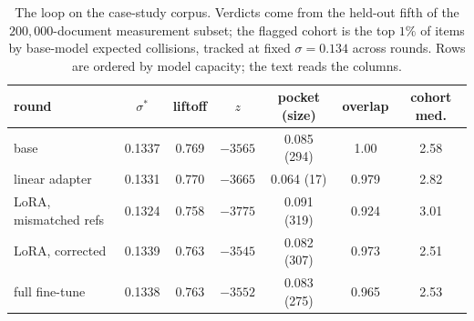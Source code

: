 \documentclass[11pt,letterpaper]{article}
\newcommand{\sstar}{\sigma^{*}}
\begin{document}
\begin{table}[t]
\centering
\caption{The loop on the case-study corpus. Verdicts come from the
held-out fifth of the $200{,}000$-document measurement subset; the flagged
cohort is the top $1\%$ of items by base-model expected collisions,
tracked at fixed $\sigma = 0.134$ across rounds. Rows are ordered by model
capacity; the text reads the columns.}
\label{tab:loop}
\small
\begin{tabular}{lcccccc}
\toprule
round & $\sstar$ & liftoff & $z$ & pocket (size) & overlap & cohort med.\\
\midrule
base & 0.1337 & 0.769 & $-3565$ & 0.085 (294) & 1.00 & 2.58\\
linear adapter & 0.1331 & 0.770 & $-3665$ & 0.064 (17) & 0.979 & 2.82\\
LoRA, mismatched refs & 0.1324 & 0.758 & $-3775$ & 0.091 (319) & 0.924 & 3.01\\
LoRA, corrected & 0.1339 & 0.763 & $-3545$ & 0.082 (307) & 0.973 & 2.51\\
full fine-tune & 0.1338 & 0.763 & $-3552$ & 0.083 (275) & 0.965 & 2.53\\
\bottomrule
\end{tabular}
\end{table}
\end{document}

